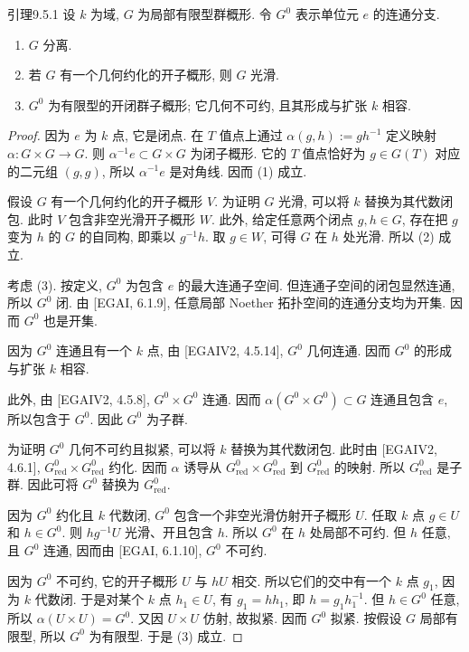 \begin{origstatement}{引理}{9.5.1}\label{ch09s05:lem9.5.1}
设 $k$ 为域, $G$ 为局部有限型群概形. 令 $G^0$ 表示单位元 $e$ 的连通分支.
\begin{enumerate}
\item[(1)] $G$ 分离.
\item[(2)] 若 $G$ 有一个几何约化的开子概形, 则 $G$ 光滑.
\item[(3)] $G^0$ 为有限型的开闭群子概形; 它几何不可约, 且其形成与扩张 $k$ 相容.
\end{enumerate}
\end{origstatement}
\begin{proof}
因为 $e$ 为 $k$ 点, 它是闭点. 在 $T$ 值点上通过 $\alpha(g,h):=gh^{-1}$ 定义映射 $\alpha:G\times G\to G$. 则 $\alpha^{-1}e\subset G\times G$ 为闭子概形. 它的 $T$ 值点恰好为 $g\in G(T)$ 对应的二元组 $(g,g)$, 所以 $\alpha^{-1}e$ 是对角线. 因而 (1) 成立.

假设 $G$ 有一个几何约化的开子概形 $V$. 为证明 $G$ 光滑, 可以将 $k$ 替换为其代数闭包. 此时 $V$ 包含非空光滑开子概形 $W$. 此外, 给定任意两个闭点 $g,h\in G$, 存在把 $g$ 变为 $h$ 的 $G$ 的自同构, 即乘以 $g^{-1}h$. 取 $g\in W$, 可得 $G$ 在 $h$ 处光滑. 所以 (2) 成立.

考虑 (3). 按定义, $G^0$ 为包含 $e$ 的最大连通子空间. 但连通子空间的闭包显然连通, 所以 $G^0$ 闭. 由 [EGAI, 6.1.9], 任意局部 Noether 拓扑空间的连通分支均为开集. 因而 $G^0$ 也是开集.

因为 $G^0$ 连通且有一个 $k$ 点, 由 [EGAIV2, 4.5.14], $G^0$ 几何连通. 因而 $G^0$ 的形成与扩张 $k$ 相容.

此外, 由 [EGAIV2, 4.5.8], $G^0\times G^0$ 连通. 因而 $\alpha(G^0\times G^0)\subset G$ 连通且包含 $e$, 所以包含于 $G^0$. 因此 $G^0$ 为子群.


为证明 $G^0$ 几何不可约且拟紧, 可以将 $k$ 替换为其代数闭包. 此时由 [EGAIV2, 4.6.1], $G^0_{\mathrm{red}}\times G^0_{\mathrm{red}}$ 约化. 因而 $\alpha$ 诱导从 $G^0_{\mathrm{red}}\times G^0_{\mathrm{red}}$ 到 $G^0_{\mathrm{red}}$ 的映射. 所以 $G^0_{\mathrm{red}}$ 是子群. 因此可将 $G^0$ 替换为 $G^0_{\mathrm{red}}$.

因为 $G^0$ 约化且 $k$ 代数闭, $G^0$ 包含一个非空光滑仿射开子概形 $U$. 任取 $k$ 点 $g\in U$ 和 $h\in G^0$. 则 $hg^{-1}U$ 光滑、开且包含 $h$. 所以 $G^0$ 在 $h$ 处局部不可约. 但 $h$ 任意, 且 $G^0$ 连通, 因而由 [EGAI, 6.1.10], $G^0$ 不可约.

因为 $G^0$ 不可约, 它的开子概形 $U$ 与 $hU$ 相交. 所以它们的交中有一个 $k$ 点 $g_1$, 因为 $k$ 代数闭. 于是对某个 $k$ 点 $h_1\in U$, 有 $g_1=hh_1$, 即 $h=g_1h_1^{-1}$. 但 $h\in G^0$ 任意, 所以 $\alpha(U\times U)=G^0$. 又因 $U\times U$ 仿射, 故拟紧. 因而 $G^0$ 拟紧. 按假设 $G$ 局部有限型, 所以 $G^0$ 为有限型. 于是 (3) 成立.
\end{proof}

